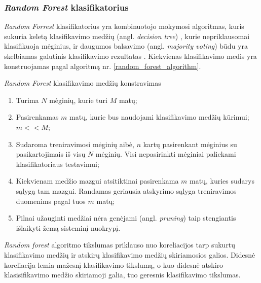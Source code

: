 


\subsubsection{\textit{Random Forest} klasifikatorius}

\textit{Random Forrest} klasifikatorius yra kombinuotojo mokymosi algoritmas, kuris sukuria keletą klasifikavimo medžių (angl. \textit{decision tree}) \cite{DBLP:books/mk/HanK2000}, kurie  nepriklausomai klasifikuoja mėginius, ir daugumos balsavimo (angl. \textit{majority voting}) būdu yra skelbiamas galutinis klasifikavimo rezultatas \cite{breiman1984classification}. Kiekvienas klasifikavimo medis yra konstruojamas pagal algoritmą nr. \ref{random_forest_algorithm}.
\begin{algorithm}
 \caption{\textit{Random Forest} klasifikavimo medžių konstravimas}
 \label{random_forest_algorithm}
 \begin{enumerate}
  \item Turima $N$ mėginių, kurie turi $M$ matų;
  \item Pasirenkamas $m$ matų, kurie bus naudojami klasifikavimo medžių kūrimui; $m << M$;
  \item Sudaroma treniravimosi mėginių aibė, $n$ kartų pasirenkant mėginius su pasikartojimais iš visų $N$ mėginių. Visi nepasirinkti mėginiai paliekami klasifikatoriaus testavimui; 
  \item Kiekvienam medžio mazgui atsitiktinai pasirenkama $m$ matų, kuries sudarys sąlygą tam mazgui. Randamas geriausia atskyrimo sąlyga treniravimos duomenims pagal tuos $m$ matų;
  \item Pilnai užauginti medžiai nėra genėjami (angl. \textit{pruning}) taip stengiantis išlaikyti žemą sisteminį nuokrypį.
 \end{enumerate}
\end{algorithm}

\textit{Random forest} algoritmo tikslumas priklauso nuo koreliacijos tarp sukurtų klasifikavimo medžių ir atskirų klasifikavimo medžių skiriamosios galios. Didesnė koreliacija lemia mažesnį klasifikavimo tikslumą, o kuo didesnė atskiro klasisifikavimo medžio skiriamoji galia, tuo geresnis klasifikavimo tikslumas.

